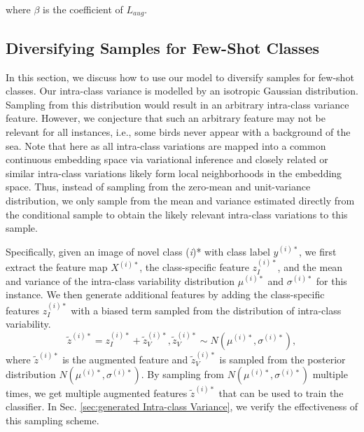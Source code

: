 \documentclass[10pt,twocolumn,letterpaper]{article}
\begin{document}
\noindent where $\beta$ is the coefficient of $L_{aug}$.



\subsection{Diversifying Samples for Few-Shot Classes} 
\label{transfer_learning_intra_class_variance}
In this section, we discuss how to use our model to diversify samples for few-shot classes.
Our intra-class variance is modelled by an isotropic Gaussian distribution. Sampling from this distribution would result in an arbitrary intra-class variance feature. However, we conjecture that such an arbitrary feature may not be relevant for all instances, i.e., some birds never appear with a background of the sea. 
Note that here as all intra-class variations are mapped into a common continuous embedding space via variational inference and closely related or similar intra-class variations likely form local neighborhoods in the embedding space. Thus,
instead of sampling from the zero-mean and unit-variance distribution, we only sample from the mean and variance estimated directly from the conditional sample to obtain the likely relevant intra-class variations to this sample. 



Specifically, given an image of novel class (\textit{i})* with class label $y^{(i)*}$, we first extract the feature map $X^{(i)*}$, the class-specific feature $z_I^{(i)*}$, and the mean and variance of the intra-class variability distribution $\mu^{(i)*}$ and $\sigma^{(i)*}$ for this instance.
     We then generate additional features by adding the class-specific features $z_I^{(i)*}$ with a biased term sampled from the distribution of intra-class variability. 
     \begin{equation} 
        \tilde{z}^{(i)*}  =  z_I^{(i)*} +  \tilde{z}_V^{(i)*} , \tilde{z}_V^{(i)*} \sim N(\mu^{(i)*}, \sigma^{(i)*}),
     \end{equation}
     \noindent where $\tilde{z}^{(i)*}$ is the augmented feature and $\tilde{z}_V^{(i)*}$ is sampled from the posterior distribution $N\left(\mu^{(i)*}, \sigma^{(i)*}\right)$.
    By sampling from $N\left(\mu^{(i)*}, \sigma^{(i)*}\right)$ multiple times, we get multiple augmented features $\tilde{z}^{(i)*}$ that can be used to train the classifier. In Sec. \ref{sec:generated Intra-class Variance}, we verify the effectiveness of this sampling scheme.
\end{document}
